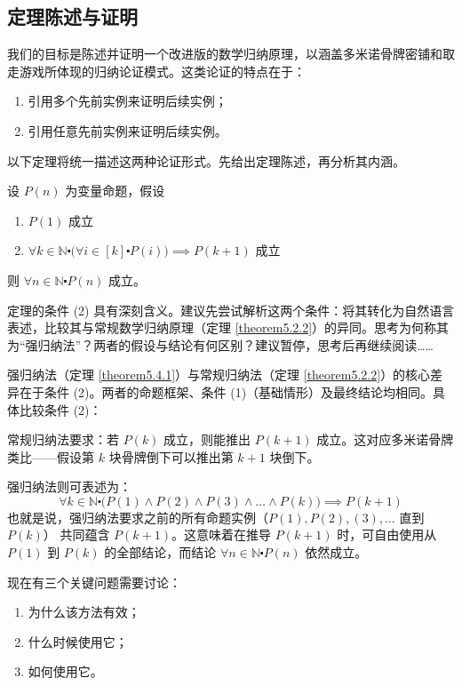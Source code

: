 \subsection{定理陈述与证明}\label{sec:section5.4.2}

我们的目标是陈述并证明一个改进版的数学归纳原理，以涵盖多米诺骨牌密铺和取走游戏所体现的归纳论证模式。这类论证的特点在于：
\begin{enumerate}[label=(\arabic*)]
    \item 引用多个先前实例来证明后续实例；
    \item 引用任意先前实例来证明后续实例。
\end{enumerate}
以下定理将统一描述这两种论证形式。先给出定理陈述，再分析其内涵。

\begin{theorem}\label{theorem5.4.1}
    设 $P(n)$ 为变量命题，假设
    \begin{enumerate}[label=(\arabic*)]
        \item $P(1)$ 成立
        \item $\forall k \in \mathbb{N} \centerdot \big(\forall i \in [k] \centerdot P(i)\big) \implies P(k+1)$ 成立
    \end{enumerate}
    则 $\forall n \in \mathbb{N} \centerdot P(n)$ 成立。
\end{theorem}

定理的条件 (2) 具有深刻含义。建议先尝试解析这两个条件：将其转化为自然语言表述，比较其与常规数学归纳原理（定理 \ref{theorem5.2.2}）的异同。思考为何称其为``强归纳法''？两者的假设与结论有何区别？建议暂停，思考后再继续阅读……

强归纳法（定理 \ref{theorem5.4.1}）与常规归纳法（定理 \ref{theorem5.2.2}）的核心差异在于条件 (2)。两者的命题框架、条件 (1)（基础情形）及最终结论均相同。具体比较条件 (2)：

常规归纳法要求：若 $P(k)$ 成立，则能推出 $P(k+1)$ 成立。这对应多米诺骨牌类比——假设第 $k$ 块骨牌倒下可以推出第 $k+1$ 块倒下。

强归纳法则可表述为：
\[\forall k \in \mathbb{N} \centerdot \big(P(1) \land P(2) \land P(3) \land \dots \land P(k)) \implies P(k+1)\]
也就是说，强归纳法要求之前的所有命题实例（$P(1), P(2), (3), \dots$ 直到 $P(k)$） 共同蕴含 $P(k+1)$。这意味着在推导 $P(k+1)$ 时，可自由使用从 $P(1)$ 到 $P(k)$ 的全部结论，而结论 $\forall n \in \mathbb{N} \centerdot P(n)$ 依然成立。

现在有三个关键问题需要讨论：
\begin{enumerate}[label=(\arabic*)]
    \item 为什么该方法有效；
    \item 什么时候使用它；
    \item 如何使用它。
\end{enumerate}

